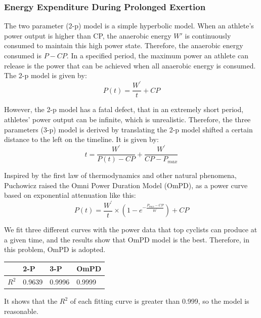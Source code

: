 \documentclass{mcmthesis}
\begin{document}
\subsubsection{Energy Expenditure During Prolonged Exertion}
The two parameter (2-p) model\cite{morton_critical_2006} is a simple hyperbolic model. When an athlete's power output is higher than CP, the anaerobic energy ${W}'$ is continuously consumed to maintain this high power state. Therefore, the anaerobic energy consumed is $P-CP$. In a specified period, the maximum power an athlete can release is the power that can be achieved when all anaerobic energy is consumed. The 2-p model is given by:
\begin{equation}
    P(t)=\frac{W^\prime}{t}+CP
\end{equation}
\par
However, the 2-p model has a fatal defect, that in an extremely short period, athletes' power output can be infinite, which is unrealistic. Therefore, the three parameters (3-p) model \cite{morton_3-parameter_1996} is derived by translating the 2-p model shifted a certain distance to the left on the timeline. It is given by:
\begin{equation}
    t=\frac{W^\prime}{P(t)-CP}+\frac{W^\prime}{CP-P_{max}}
\end{equation}
\par
Inspired by the first law of thermodynamics and other natural phenomena, Puchowicz\cite{puchowicz_development_2020} raised the Omni Power Duration Model (OmPD), as a power curve based on exponential attenuation like this:
\begin{equation}
    P(t)=\frac{W^\prime}{t}\times(1-e^{-\frac{P_{max}-CP}{W^\prime}})+CP
\end{equation}
\par
We fit three different curves with the power data that top cyclists can produce at a given time, and the results show that OmPD model is the best. Therefore, in this problem, OmPD is adopted.
\begin{table}[H]
\centering
\begin{tabular}{llll}
\hline
  & 2-P    & 3-P    & OmPD   \\ \hline
$R^2$ & 0.9639 & 0.9996 & 0.9999 \\ \hline
\end{tabular}
\end{table}
It shows that the $R^2$ of each fitting curve is greater than 0.999, so the model is reasonable.
\end{document}
